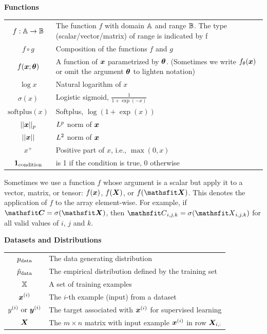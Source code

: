\vspace{\notationgap}
\noindent\begin{minipage}{\textwidth}
\centerline{\bf Functions}
\bgroup
\def\arraystretch{1.5}
\begin{tabular}{cp{3.25in}}
$\displaystyle f: {\mathbb{A}} \rightarrow {\mathbb{B}}$ & The function $f$ with domain ${\mathbb{A}}$ and range ${\mathbb{B}}$. The type (scalar/vector/matrix) of range is indicated by f\\
$\displaystyle f \circ g $ & Composition of the functions $f$ and $g$ \\
  $\displaystyle f({\bm{x}} ; {\bm{\theta}}) $ & A function of ${\bm{x}}$ parametrized by ${\bm{\theta}}$.
  (Sometimes we write $f_\theta({\bm{x}})$ or omit the argument ${\bm{\theta}}$ to lighten notation) \\
$\displaystyle \log x$ & Natural logarithm of $x$ \\
$\displaystyle \sigma(x)$ & Logistic sigmoid, $\displaystyle \frac{1} {1 + \exp(-x)}$ \\
$\displaystyle \mathrm{softplus}(x)$ & Softplus, $\log(1 + \exp(x))$ \\
$\displaystyle || {\bm{x}} ||_p $ & $L^p$ norm of ${\bm{x}}$ \\
$\displaystyle || {\bm{x}} || $ & $L^2$ norm of ${\bm{x}}$ \\
$\displaystyle x^+$ & Positive part of $x$, i.e., $\max(0,x)$\\
$\displaystyle \bm{1}_\mathrm{condition}$ & is 1 if the condition is true, 0 otherwise\\
\end{tabular}
\egroup
{}
\end{minipage}

Sometimes we use a function $f$ whose argument is a scalar but apply
it to a vector, matrix, or tensor: $f({\bm{x}})$, $f({\bm{X}})$, or $f(\tX)$.
This denotes the application of $f$ to the
array element-wise. For example, if $\tC = \sigma(\tX)$, then $\etC_{i,j,k} = \sigma(\etX_{i,j,k})$
for all valid values of $i$, $j$ and $k$.


\vspace{\notationgap}
\noindent\begin{minipage}{\textwidth}
\centerline{\bf Datasets and Distributions}
\bgroup
\def\arraystretch{1.5}
\begin{tabular}{cp{3.25in}}
$\displaystyle p_{\rm{data}}$ & The data generating distribution\\
$\displaystyle \hat{p}_{\rm{data}}$ & The empirical distribution defined by the training set\\
$\displaystyle {\mathbb{X}}$ & A set of training examples\\
$\displaystyle {\bm{x}}^{(i)}$ & The $i$-th example (input) from a dataset\\
$\displaystyle y^{(i)}\text{ or }{\bm{y}}^{(i)}$ & The target associated with ${\bm{x}}^{(i)}$ for supervised learning\\
$\displaystyle {\bm{X}}$ & The $m \times n$ matrix with input example ${\bm{x}}^{(i)}$ in row ${\bm{X}}_{i,:}$\\
\end{tabular}
\egroup
\end{minipage}

